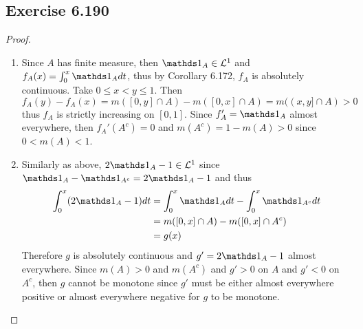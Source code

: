 \documentclass[hw_all.tex]{subfiles}
\begin{document}
\subsection{Exercise 6.190}
\begin{proof}
    \begin{enumerate}
        \item 
            Since $A$ has finite measure, then $\ind{A} \in \mathcal{L}^1$ and $f_A(x) = \int_{0}^x \ind{A} dt$, thus by Corollary 6.172, $f_A$ is absolutely continuous. Take $0 \leq x < y \leq 1$. Then
            \[
                f_A(y) - f_A(x) = m([0,y] \cap A) - m([0,x] \cap A) = m((x,y] \cap A) > 0
            \]
            thus $f_A$ is strictly increasing on $[0,1]$. Since $f_A' = \ind{A}$ almost everywhere, then $f_A'(A^c) = 0$ and $m(A^c) = 1 - m(A) > 0$ since $0 < m(A) < 1$.

        \item 
            Similarly as above, $2\ind{A} - 1 \in \mathcal{L}^1$ since $\ind{A} - \ind{A^c} = 2\ind{A} - 1$ and thus
            \begin{align*}
                \int_0^x (2 \ind{A} - 1) dt &= \int_0^x \ind{A} dt - \int_0^x \ind{A^c} dt \\
                                            &= m([0,x] \cap A) - m([0,x] \cap A^c) \\
                                            &= g(x)
            \end{align*}
            Therefore $g$ is absolutely continuous and $g' = 2\ind{A} - 1$ almost everywhere. Since $m(A) > 0$ and $m(A^c)$ and $g' > 0$ on $A$ and $g' < 0$ on $A^c$, then $g$ cannot be monotone since $g'$ must be either almost everywhere positive or almost everywhere negative for $g$ to be monotone.
    \end{enumerate}
\end{proof}
\end{document}
